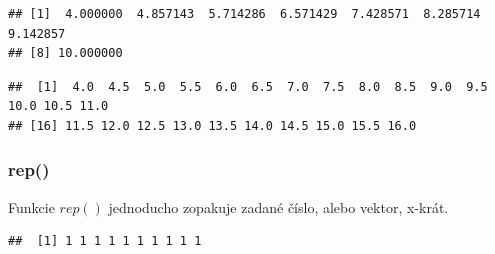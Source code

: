 \begin{Shaded}
\begin{Highlighting}[]
\NormalTok{(} \NormalTok{, } \NormalTok{, } \NormalTok{)}
\end{Highlighting}
\end{Shaded}

\begin{verbatim}
## [1]  4.000000  4.857143  5.714286  6.571429  7.428571  8.285714  9.142857
## [8] 10.000000
\end{verbatim}

\begin{Shaded}
\begin{Highlighting}[]

\NormalTok{(} \NormalTok{, } \NormalTok{, } \NormalTok{)}
\end{Highlighting}
\end{Shaded}

\begin{verbatim}
##  [1]  4.0  4.5  5.0  5.5  6.0  6.5  7.0  7.5  8.0  8.5  9.0  9.5 10.0 10.5 11.0
## [16] 11.5 12.0 12.5 13.0 13.5 14.0 14.5 15.0 15.5 16.0
\end{verbatim}

\hypertarget{rep}{%
\subsubsection{rep()}\label{rep}}

Funkcie \(rep()\) jednoducho zopakuje zadané číslo, alebo vektor,
x-krát.

\begin{Shaded}
\begin{Highlighting}[]
\NormalTok{(} \NormalTok{, } \NormalTok{)}
\end{Highlighting}
\end{Shaded}

\begin{verbatim}
##  [1] 1 1 1 1 1 1 1 1 1 1
\end{verbatim}

\begin{Shaded}
\begin{Highlighting}[]
\NormalTok{(} \NormalTok{(}\NormalTok{, }\NormalTok{, }\NormalTok{), } \NormalTok{)}
\end{Highlighting}
\end{Shaded}

